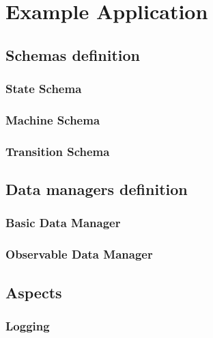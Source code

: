 \chapter{Example Application}\label{Example Application}

\section{Schemas definition}

\subsection{State Schema}

\subsection{Machine Schema}

\subsection{Transition Schema}

\section{Data managers definition}

\subsection{Basic Data Manager}

\subsection{Observable Data Manager}

\section{Aspects}

\subsection{Logging}